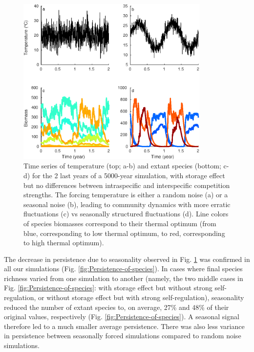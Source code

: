 \documentclass[a4paper,12pt]{article}
\begin{document}
\begin{figure}[!ht]
\begin{centering}
\includegraphics[width=0.85\textwidth]{Fig1}
\par\end{centering}
\caption{Time series of temperature (top; a-b) and extant species (bottom;
c-d) for the 2 last years of a 5000-year simulation, with storage
effect but no differences between intraspecific and interspecific
competition strengths. The forcing temperature is either a random
noise (a) or a seasonal noise (b), leading to community dynamics with
more erratic fluctuations (c) vs seasonally structured fluctuations
(d). Line colors of species biomasses correspond to their thermal
optimum (from blue, corresponding to low thermal optimum, to red,
corresponding to high thermal optimum).\label{fig:Times-series_temperature_species}}
\end{figure}

The decrease in persistence due to seasonality observed in Fig. \ref{fig:Times-series_temperature_species}
was confirmed in all our simulations (Fig. \ref{fig:Persistence-of-species}).
In cases where final species richness varied from one simulation to
another (namely, the two middle cases in Fig. \ref{fig:Persistence-of-species}:
with storage effect but without strong self-regulation, or without
storage effect but with strong self-regulation), seasonality reduced
the number of extant species to, on average, 27\% and 48\% of their
original values, respectively (Fig. \ref{fig:Persistence-of-species}).
A seasonal signal therefore led to a much smaller average persistence.
There was also less variance in persistence between seasonally forced
simulations compared to random noise simulations. 
\end{document}
